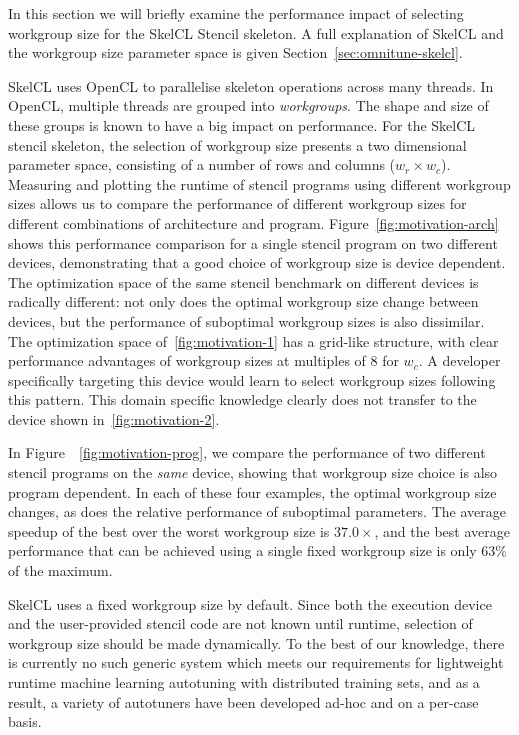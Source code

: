 \documentclass[nonatbib,preprint,nocopyrightspace,9pt]{sigplanconf}
\begin{document}
In this section we will briefly examine the performance impact of
selecting workgroup size for the SkelCL Stencil skeleton. A full
explanation of SkelCL and the workgroup size parameter space is given
Section~\ref{sec:omnitune-skelcl}.

SkelCL uses OpenCL to parallelise skeleton operations across many
threads. In OpenCL, multiple threads are grouped into
\emph{workgroups}. The shape and size of these groups is known to have
a big impact on performance. For the SkelCL stencil skeleton, the
selection of workgroup size presents a two dimensional parameter
space, consisting of a number of rows and columns ($w_r \times w_c$).
Measuring and plotting the runtime of stencil programs using different
workgroup sizes allows us to compare the performance of different
workgroup sizes for different combinations of architecture and
program. Figure~\ref{fig:motivation-arch} shows this performance
comparison for a single stencil program on two different devices,
demonstrating that a good choice of workgroup size is device
dependent. The optimization space of the same stencil benchmark on
different devices is radically different: not only does the optimal
workgroup size change between devices, but the performance of
suboptimal workgroup sizes is also dissimilar. The optimization space
of~\ref{fig:motivation-1} has a grid-like structure, with clear
performance advantages of workgroup sizes at multiples of 8 for
$w_c$. A developer specifically targeting this device would learn to
select workgroup sizes following this pattern. This domain specific
knowledge clearly does not transfer to the device shown
in~\ref{fig:motivation-2}.

In Figure~~\ref{fig:motivation-prog}, we compare the performance of
two different stencil programs on the \emph{same} device, showing that
workgroup size choice is also program dependent. In each of these four
examples, the optimal workgroup size changes, as does the relative
performance of suboptimal parameters. The average speedup of the best
over the worst workgroup size is $37.0\times$, and the best average
performance that can be achieved using a single fixed workgroup size
is only 63\% of the maximum.

SkelCL uses a fixed workgroup size by default. Since both the
execution device and the user-provided stencil code are not known
until runtime, selection of workgroup size should be made
dynamically. To the best of our knowledge, there is currently no such
generic system which meets our requirements for lightweight runtime
machine learning autotuning with distributed training sets, and as a
result, a variety of autotuners have been developed ad-hoc and on a
per-case basis.
\end{document}
